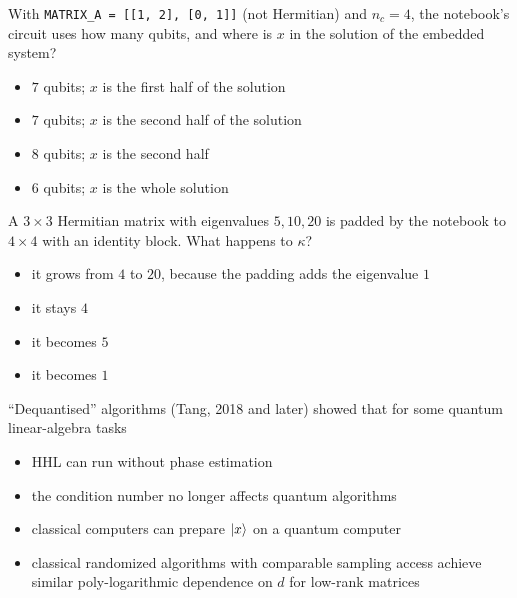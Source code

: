\documentclass[11pt,a4paper]{article}
\newcommand{\optlabel}[1]{\textbf{(#1)}}
\newenvironment{qitem}[1]{\begin{list}{}{\setlength{\leftmargin}{3.3em}\setlength{\labelwidth}{3.1em}%
  \setlength{\labelsep}{0.2em}\setlength{\topsep}{3pt}\setlength{\parsep}{3pt}}\item[\textbf{Q.#1}\hfill]}{\end{list}}
\newcommand{\qsep}{\par\vspace{2pt}{\color{black!15}\hrule}\vspace{4pt}}
\begin{document}
\begin{qitem}{66}
With \texttt{MATRIX\_A = [[1, 2], [0, 1]]} (not Hermitian) and $n_c = 4$, the notebook's circuit uses how many qubits, and where is $x$ in the solution of the embedded system?
\begin{itemize}[leftmargin=2.6em, labelsep=0.4em, itemsep=2pt, topsep=3pt]
\item[\optlabel{A}] $7$ qubits; $x$ is the first half of the solution
\item[\optlabel{B}] $7$ qubits; $x$ is the second half of the solution
\item[\optlabel{C}] $8$ qubits; $x$ is the second half
\item[\optlabel{D}] $6$ qubits; $x$ is the whole solution
\end{itemize}
\end{qitem}
\qsep

\begin{qitem}{67}
A $3\times3$ Hermitian matrix with eigenvalues $5, 10, 20$ is padded by the notebook to $4\times4$ with an identity block. What happens to $\kappa$?
\begin{itemize}[leftmargin=2.6em, labelsep=0.4em, itemsep=2pt, topsep=3pt]
\item[\optlabel{A}] it grows from $4$ to $20$, because the padding adds the eigenvalue $1$
\item[\optlabel{B}] it stays $4$
\item[\optlabel{C}] it becomes $5$
\item[\optlabel{D}] it becomes $1$
\end{itemize}
\end{qitem}
\qsep

\begin{qitem}{68}
``Dequantised'' algorithms (Tang, 2018 and later) showed that for some quantum linear-algebra tasks
\begin{itemize}[leftmargin=2.6em, labelsep=0.4em, itemsep=2pt, topsep=3pt]
\item[\optlabel{A}] HHL can run without phase estimation
\item[\optlabel{B}] the condition number no longer affects quantum algorithms
\item[\optlabel{C}] classical computers can prepare $\ket x$ on a quantum computer
\item[\optlabel{D}] classical randomized algorithms with comparable sampling access achieve similar poly-logarithmic dependence on $d$ for low-rank matrices
\end{itemize}
\end{qitem}
\qsep
\end{document}
